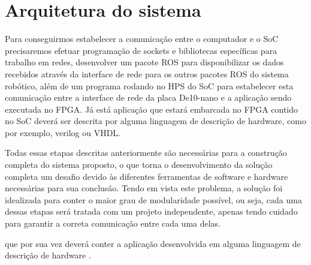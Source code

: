 \chapter{Arquitetura do sistema}

Para conseguirmos estabelecer a comunicação entre o computador e o SoC precisaremos efetuar programação de sockets e bibliotecas específicas para trabalho em redes, desenvolver um pacote ROS para disponibilizar os dados recebidos através da interface de rede para os outros pacotes ROS do sistema robótico, além de um programa rodando no HPS do SoC para estabelecer esta comunicação entre a interface de rede da placa De10-nano e a aplicação sendo executada no FPGA. Já está aplicação que estará embarcada no FPGA contido no SoC deverá ser descrita por alguma linguagem de descrição de hardware, como por exemplo, verilog ou VHDL.

Todas essas etapas descritas anteriormente são necessárias para a construção completa do sistema proposto, o que torna o desenvolvimento da solução completa um desafio devido às diferentes ferramentas de software e hardware necessárias para sua conclusão. Tendo em vista este problema, a solução foi idealizada para conter o maior grau de modularidade possível, ou seja, cada uma dessas etapas será tratada com um projeto independente, apenas tendo cuidado para garantir a correta comunicação entre cada uma delas.

 que por sua vez deverá conter a aplicação desenvolvida em alguma linguagem de descrição de hardware . 



 








